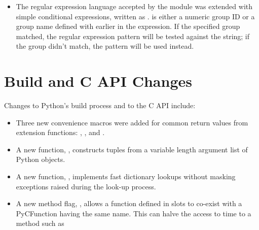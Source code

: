 \documentclass{howto}
\begin{document}
\begin{itemize}
\item The regular expression language accepted by the  module
   was extended with simple conditional expressions, written as
   .   is either a
   numeric group ID or a group name defined with  
   earlier in the expression.  If the specified group matched, the
   regular expression pattern  will be tested against the string; if
   the group didn't match, the pattern  will be used instead.
   
\end{itemize}




\section{Build and C API Changes}

Changes to Python's build process and to the C API include:

\begin{itemize}

  \item Three new convenience macros were added for common return
  values from extension functions: ,
  , and .

  \item A new function, , constructs tuples from a variable
  length argument list of Python objects.

  \item A new function, ,
  implements fast dictionary lookups without masking exceptions raised
  during the look-up process.

  \item A new method flag, , allows a function
  defined in slots to co-exist with a PyCFunction having the same name.
  This can halve the access to time to a method such as

\end{itemize}


\end{document}
